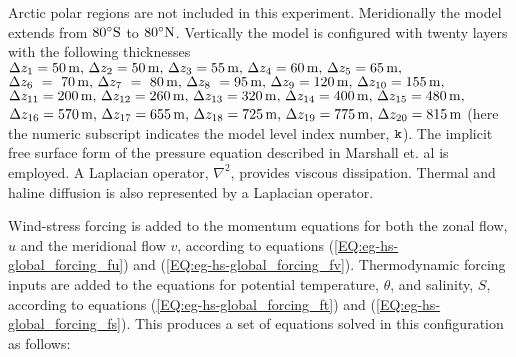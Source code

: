 Arctic polar regions are not
included in this experiment. Meridionally the model extends from
$80^{\circ}{\rm S}$ to $80^{\circ}{\rm N}$.
Vertically the model is configured with twenty layers with the 
following thicknesses
$\Delta z_{1} = 50\,{\rm m},\,
 \Delta z_{2} = 50\,{\rm m},\,
 \Delta z_{3} = 55\,{\rm m},\,
 \Delta z_{4} = 60\,{\rm m},\,
 \Delta z_{5} = 65\,{\rm m},\,
$
$
 \Delta z_{6}~=~70\,{\rm m},\,
 \Delta z_{7}~=~80\,{\rm m},\,
 \Delta z_{8}~=95\,{\rm m},\,
 \Delta z_{9}=120\,{\rm m},\,
 \Delta z_{10}=155\,{\rm m},\,
$
$
 \Delta z_{11}=200\,{\rm m},\,
 \Delta z_{12}=260\,{\rm m},\,
 \Delta z_{13}=320\,{\rm m},\,
 \Delta z_{14}=400\,{\rm m},\,
 \Delta z_{15}=480\,{\rm m},\,
$
$
 \Delta z_{16}=570\,{\rm m},\,
 \Delta z_{17}=655\,{\rm m},\,
 \Delta z_{18}=725\,{\rm m},\,
 \Delta z_{19}=775\,{\rm m},\,
 \Delta z_{20}=815\,{\rm m}
$ (here the numeric subscript indicates the model level index number, ${\tt k}$).
The implicit free surface form of the pressure equation described in Marshall et. al 
\cite{marshall:97a} is employed. A Laplacian operator, $\nabla^2$, provides viscous
dissipation. Thermal and haline diffusion is also represented by a Laplacian operator.

Wind-stress forcing is added to the momentum equations for both
the zonal flow, $u$ and the meridional flow $v$, according to equations 
(\ref{EQ:eg-hs-global_forcing_fu}) and (\ref{EQ:eg-hs-global_forcing_fv}).
Thermodynamic forcing inputs are added to the equations for
potential temperature, $\theta$, and salinity, $S$, according to equations 
(\ref{EQ:eg-hs-global_forcing_ft}) and (\ref{EQ:eg-hs-global_forcing_fs}).
This produces a set of equations solved in this configuration as follows:

